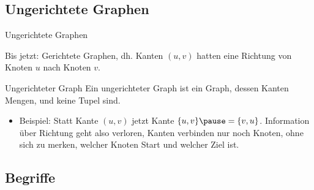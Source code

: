 \subsection{Ungerichtete Graphen}
\begin{frame}{Ungerichtete Graphen}
	\begin{itemize}
		\pitem Bis jetzt\ip: Gerichtete Graphen\ip, dh. Kanten $(u,v)$ hatten eine Richtung von Knoten $u$ nach Knoten $v$.
	\end{itemize}

	\bp
	
	\begin{block}{Ungerichteter Graph}
		Ein ungerichteter Graph ist ein Graph\ip, dessen Kanten Mengen, und keine Tupel sind.
	\end{block}

	\bp
	
	\begin{itemize}
		\item Beispiel: Statt Kante $(u,v)$ jetzt Kante $\{u,v\} \pause = \{v, u\}$.
		\pitem Information über Richtung geht also verloren, Kanten verbinden nur noch Knoten, ohne sich zu merken, welcher Knoten Start und welcher Ziel ist.
	\end{itemize}
\end{frame}

\subsection{Begriffe}

